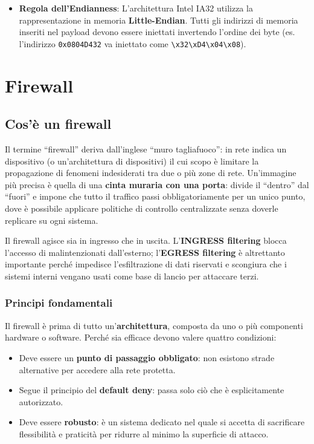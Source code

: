 \documentclass[12pt, a4paper]{report}
\begin{document}
\begin{itemize}
	\item \textbf{Regola dell'Endianness}: L'architettura Intel IA32 utilizza la rappresentazione in memoria \textbf{Little-Endian}. Tutti gli indirizzi di memoria inseriti nel payload devono essere iniettati invertendo l'ordine dei byte (es. l'indirizzo \texttt{0x0804D432} va iniettato come \texttt{\textbackslash x32\textbackslash xD4\textbackslash x04\textbackslash x08}).
\end{itemize}

\chapter{Firewall}

\section{Cos'è un firewall}

Il termine ``firewall'' deriva dall'inglese ``muro tagliafuoco'': in rete indica un dispositivo (o un'architettura di dispositivi) il cui scopo è limitare la propagazione di fenomeni indesiderati tra due o più zone di rete. Un'immagine più precisa è quella di una \textbf{cinta muraria con una porta}: divide il ``dentro'' dal ``fuori'' e impone che tutto il traffico passi obbligatoriamente per un unico punto, dove è possibile applicare politiche di controllo centralizzate senza doverle replicare su ogni sistema.

Il firewall agisce sia in ingresso che in uscita. L'\textbf{INGRESS filtering} blocca l'accesso di malintenzionati dall'esterno; l'\textbf{EGRESS filtering} è altrettanto importante perché impedisce l'esfiltrazione di dati riservati e scongiura che i sistemi interni vengano usati come base di lancio per attaccare terzi.

\subsection{Principi fondamentali}
Il firewall è prima di tutto un'\textbf{architettura}, composta da uno o più componenti hardware o software. Perché sia efficace devono valere quattro condizioni:
\begin{itemize}
	\item Deve essere un \textbf{punto di passaggio obbligato}: non esistono strade alternative per accedere alla rete protetta.
	\item Segue il principio del \textbf{default deny}: passa solo ciò che è esplicitamente autorizzato.
	\item Deve essere \textbf{robusto}: è un sistema dedicato nel quale si accetta di sacrificare flessibilità e praticità per ridurre al minimo la superficie di attacco.
\end{itemize}
\end{document}
